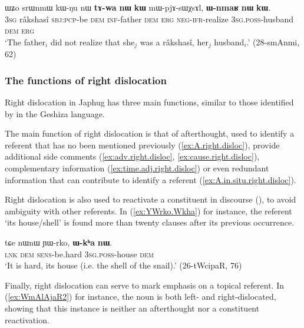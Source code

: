\begin{exe}
\ex \label{ex:A.in.situ.right.disloc}
\gll ɯʑo srɯnmɯ kɯ-ŋu nɯ \textbf{tɤ-wa} \textbf{nɯ} \textbf{kɯ} mɯ-pjɤ-sɯχsɤl, \textbf{ɯ-nmaʁ} \textbf{nɯ} \textbf{kɯ}. \\
\textsc{3sg} râkshasî \textsc{sbj}:\textsc{pcp}-be \textsc{dem} \textsc{inf}-father \textsc{dem} \textsc{erg} \textsc{neg}-\textsc{ifr}-realize \textsc{3sg}.\textsc{poss}-husband \textsc{dem} \textsc{erg} \\
\glt `The father$_i$ did not realize that she$_j$ was a râkshasî, her$_j$ husband$_i$.' (28-smAnmi, 62)
\end{exe}

\subsubsection{The functions of right dislocation} \label{sec:right.dislocation.function}
Right dislocation in Japhug has three main functions, similar to those identified by \citet[§13.7.2]{honkasalo19geshiza} in the Geshiza language.

The main function of right dislocation is that of afterthought, used to identify a referent that has no been mentioned previously (\ref{ex:A.right.disloc}), provide additional side comments (\ref{ex:adv.right.disloc}, \ref{ex:cause.right.disloc}), complementary information (\ref{ex:time.adj.right.disloc}) or even redundant information that can contribute to identify a referent (\ref{ex:A.in.situ.right.disloc}).  

Right dislocation is also used to reactivate a constituent in discourse (\citealt[§13.7.2]{honkasalo19geshiza}), to avoid ambiguity with other referents. In (\ref{ex:YWrko.Wkha}) for instance, the referent  `its house/shell' is found more than twenty clauses after its previous occurrence.

\begin{exe}
\ex \label{ex:YWrko.Wkha}
\gll tɕe nɯnɯ ɲɯ-rko, \textbf{ɯ-kʰa} \textbf{nɯ}. \\
\textsc{lnk} \textsc{dem} \textsc{sens}-be.hard \textsc{3sg}.\textsc{poss}-house \textsc{dem} \\
\glt `It is hard, its house (i.e. the shell of the snail).' (26-tWcipaR, 76)
\end{exe}

Finally, right dislocation can serve to mark emphasis on a topical referent. In (\ref{ex:WmAlAjaR2}) for instance, the noun  is both left- and right-dislocated, showing that this instance is neither an afterthought nor a constituent reactivation.

